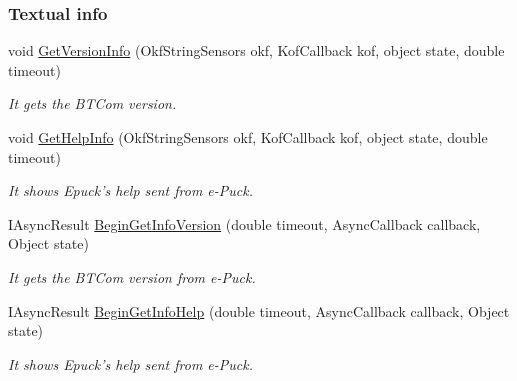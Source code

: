 \subsubsection*{Textual info} %
\label{ssub:Textual infon}
  \begin{DoxyCompactItemize}
  \item   void \hyperlink{class_elib_1_1_epuck_aa7ed3e58936ccd1d52596b318d5ddccc}{GetVersionInfo} (OkfStringSensors okf, KofCallback kof, object state, double timeout)
  \begin{DoxyCompactList}\small\item\em It gets the BTCom version. \item\end{DoxyCompactList}

  \item   void \hyperlink{class_elib_1_1_epuck_a1569f01c2a34bb335d2f7a12c94de891}{GetHelpInfo} (OkfStringSensors okf, KofCallback kof, object state, double timeout)
  \begin{DoxyCompactList}\small\item\em It shows Epuck's help sent from e-\/Puck. \item\end{DoxyCompactList}

  \item   IAsyncResult \hyperlink{class_elib_1_1_epuck_a0146f79525c327c913b540186e354916}{BeginGetInfoVersion} (double timeout, AsyncCallback callback, Object state)
  \begin{DoxyCompactList}\small\item\em It gets the BTCom version from e-\/Puck. \item\end{DoxyCompactList}

  \item   IAsyncResult \hyperlink{class_elib_1_1_epuck_a0e599fe0065ac2c3ae2ac96aede901c6}{BeginGetInfoHelp} (double timeout, AsyncCallback callback, Object state)
  \begin{DoxyCompactList}\small\item\em It shows Epuck's help sent from e-\/Puck. \item\end{DoxyCompactList}

  \end{DoxyCompactItemize}

